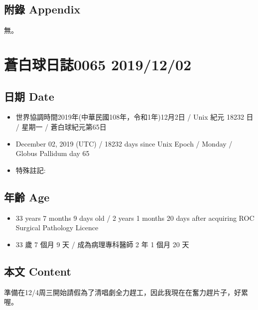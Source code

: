 \documentclass[
]{article}
\providecommand{\tightlist}{%
  \setlength{\itemsep}{0pt}\setlength{\parskip}{0pt}}
\begin{document}
\hypertarget{ux9644ux9304-appendix}{%
\subsection{附錄 Appendix}\label{ux9644ux9304-appendix}}

無。

\hypertarget{ux84bcux767dux7403ux65e5ux8a8c0065-20191202}{%
\section{蒼白球日誌0065
2019/12/02}\label{ux84bcux767dux7403ux65e5ux8a8c0065-20191202}}

\hypertarget{ux65e5ux671f-date-1}{%
\subsection{日期 Date}\label{ux65e5ux671f-date-1}}

\begin{itemize}
\tightlist
\item
  世界協調時間2019年(中華民國108年，令和1年)12月2日 / Unix 紀元 18232 日
  / 星期一 / 蒼白球紀元第65日
\item
  December 02, 2019 (UTC) / 18232 days since Unix Epoch / Monday /
  Globus Pallidum day 65
\item
  特殊註記:
\end{itemize}

\hypertarget{ux5e74ux9f61-age-1}{%
\subsection{年齡 Age}\label{ux5e74ux9f61-age-1}}

\begin{itemize}
\tightlist
\item
  33 years 7 months 9 days old / 2 years 1 months 20 days after
  acquiring ROC Surgical Pathology Licence
\item
  33 歲 7 個月 9 天 / 成為病理專科醫師 2 年 1 個月 20 天
\end{itemize}

\hypertarget{ux672cux6587-content-1}{%
\subsection{本文 Content}\label{ux672cux6587-content-1}}

準備在12/4周三開始請假為了清唱劇全力趕工，因此我現在在奮力趕片子，好累喔。
\end{document}
